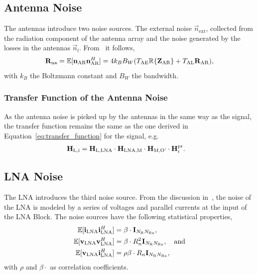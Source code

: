 \subsection{Antenna Noise}
\label{sec:antenna_noise}

The antennas introduce two noise sources.
The external noise $\vec{n}_\text{ext}$, collected from the radiation component of the antenna array and the noise generated by the losses in the antennas $\vec{n}_l$.
From~\cite{Twiss1955} it follows, 
\begin{equation}
\label{eq:cov_ant}
\mathbf{R}_\text{na} = \mathbb{E}[\mathbf{n}_\text{AR}\mathbf{n}_\text{AR}^H] = 4 k_B B_W(T_\text{AE}\mathbb{R}\{\mathbf{Z}_\text{AR}\}+T_\text{AL}\mathbf{R}_\text{AR}),
\end{equation}
with $k_B$ the Boltzmann constant and $B_W$ the bandwidth.

\subsubsection{Transfer Function of the Antenna Noise}
\label{sec:antenna_noise_transf}
As the antenna noise is picked up by the antennas in the same way as the signal, the transfer function remains the same as the one derived in Equation~\eqref{eq:transfer_function} for the signal, e.g.
\begin{align}
\mathbf{H}_\text{L,i} &= \mathbf{H}_\text{L,LNA}\cdot\mathbf{H}_\text{LNA,M}\cdot\mathbf{H}_\text{M,O'} \cdot \mathbf{H}_i^{\text{pr}}.
\end{align}

\subsection{LNA Noise}
\label{sec:lna_noise}

The LNA introduces the third noise source.
From the discussion in~\cite{Nossek}, the noise of the LNA is modeled by a series of voltages and parallel currents at the input of the LNA Block.
The noise sources have the following statistical properties,
\begin{align}
\label{eq:cov_lna}
\mathbb{E}[\mathbf{i}_\text{LNA}\mathbf{i}_\text{LNA}^H] &= \beta \cdot \mathbf{I}_{N_\text{R}N_\text{Rx}},\\\nonumber
\mathbb{E}[\mathbf{v}_\text{LNA}\mathbf{v}_\text{LNA}^H] &= \beta \cdot R_n^2\mathbf{I}_{N_\text{R}N_\text{Rx}},\quad\text{and}\\\nonumber
\mathbb{E}[\mathbf{v}_\text{LNA}\mathbf{i}_\text{LNA}^H] &= \rho \beta \cdot R_n\mathbf{I}_{N_\text{R}N_\text{Rx}},
\end{align}
with $\rho$ and $\beta \cdot$ as correlation coefficients.

